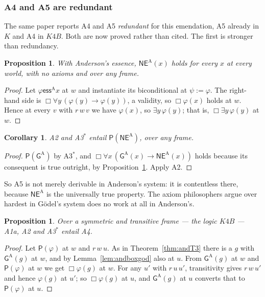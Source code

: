 \documentclass[11pt]{article}
\theoremstyle{plain}
\newtheorem{proposition}[theorem]{Proposition}
\newtheorem{corollary}[theorem]{Corollary}
\theoremstyle{definition}
\newcommand{\ess}{\mathrel{\mathsf{ess}}}
\newcommand{\NE}{\mathsf{NE}}
\newcommand{\Gd}{\mathsf{G}}
\newcommand{\Pos}{\mathsf{P}}
\begin{document}
\subsubsection*{A4 and A5 are redundant}

The same paper reports A4 and A5 \emph{redundant} for this emendation, A5
already in $K$ and A4 in $K4B$. Both are now proved rather than cited. The
first is stronger than redundancy.

\begin{proposition}\label{prop:nevac}
With Anderson's essence, $\NE^{\mathrm{A}}(x)$ holds for every $x$ at every
world, with no axioms and over any frame.
\end{proposition}

\begin{proof}
Let $\varphi \ess^{\mathrm{A}} x$ at $w$ and instantiate its biconditional at
$\psi := \varphi$. The right-hand side is
$\Box\forall y\,(\varphi(y) \to \varphi(y))$, a validity, so $\Box\varphi(x)$
holds at $w$. Hence at every $v$ with $r\,w\,v$ we have $\varphi(x)$, so
$\exists y\,\varphi(y)$; that is, $\Box\exists y\,\varphi(y)$ at $w$.
\end{proof}

\begin{corollary}\label{cor:a5}
A2 and A3$^{*}$ entail $\Pos(\NE^{\mathrm{A}})$, over any frame.
\end{corollary}

\begin{proof}
$\Pos(\Gd^{\mathrm{A}})$ by A3$^{*}$, and
$\Box\forall x\,(\Gd^{\mathrm{A}}(x) \to \NE^{\mathrm{A}}(x))$ holds because
its consequent is true outright, by Proposition~\ref{prop:nevac}. Apply A2.
\end{proof}

\noindent
So A5 is not merely derivable in Anderson's system: it is contentless there,
because $\NE^{\mathrm{A}}$ is the universally true property. The axiom
philosophers argue over hardest in G\"odel's system does no work at all in
Anderson's.

\begin{proposition}\label{prop:a4}
Over a symmetric and transitive frame --- the logic $K4B$ --- A1a, A2 and
A3$^{*}$ entail A4.
\end{proposition}

\begin{proof}
Let $\Pos(\varphi)$ at $w$ and $r\,w\,u$. As in Theorem~\ref{thm:andT3} there
is a $g$ with $\Gd^{\mathrm{A}}(g)$ at $w$, and by Lemma~\ref{lem:andboxgod} also
at $u$. From $\Gd^{\mathrm{A}}(g)$ at $w$ and $\Pos(\varphi)$ at $w$ we get
$\Box\varphi(g)$ at $w$. For any $u'$ with $r\,u\,u'$, transitivity gives
$r\,w\,u'$ and hence $\varphi(g)$ at $u'$; so $\Box\varphi(g)$ at $u$, and
$\Gd^{\mathrm{A}}(g)$ at $u$ converts that to $\Pos(\varphi)$ at $u$.
\end{proof}
\end{document}
